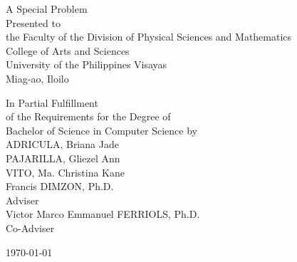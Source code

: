\begin{titlepage}
	\centering
	
	
	\vspace{0.5cm}
	A Special Problem\\
	Presented to\\
	the Faculty of the Division of Physical Sciences and Mathematics\\
	College of Arts and Sciences\\
	University of the Philippines Visayas\\
	Miag-ao, Iloilo
	
	\vspace{0.5cm}
	In Partial Fulfillment\\
	of the Requirements for the Degree of\\
	Bachelor of Science in Computer Science
	\vspace{1.75cm}
	by\\
	
	\vspace*{-0.7cm}
	ADRICULA, Briana Jade  \\
	PAJARILLA, Gliezel Ann  \\
	VITO, Ma. Christina Kane  \\
	
	\vspace{0.875cm}
	Francis DIMZON, Ph.D.\\
	Adviser\\
	Victor Marco Emmanuel FERRIOLS, Ph.D.\\
	Co-Adviser
	
	\vspace{0.875cm}
	\today
\end{titlepage}
